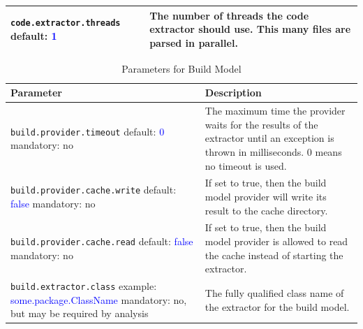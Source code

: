 \begin{table}[t]
\begin{tabularx}{\textwidth}{|p{}|p{}|}
        \texttt{code.extractor.threads} \newline default: \textcolor{blue}{1} & The number of threads the code extractor should use. This many files are parsed in parallel. \\ \hline
        
    \end{tabularx}
\end{table}

\begin{table}[t] %
    \caption{Parameters for Build Model} \label{tab:propfile}
    \begin{tabularx}{\textwidth}{|p{}|p{}|}\hline
        \textbf{Parameter} & \textbf{Description} \\ \hline \hline

        \texttt{build.provider.timeout}  \newline default: \textcolor{blue}{0} \newline mandatory: no  & The maximum time the provider waits for the results of the extractor until an exception is thrown in milliseconds. 0 means no timeout is used. \\ \hline

        \texttt{build.provider.cache.write} \newline default: \textcolor{blue}{false} \newline mandatory: no & If set to true, then the build model provider will write its result to the cache directory.\\ \hline
         
        \texttt{build.provider.cache.read} \newline default: \textcolor{blue}{false}  \newline mandatory: no &  If set to true, then the build model provider is allowed to read the cache instead of starting the extractor. \\ \hline
        
        \texttt{build.extractor.class} \newline example: \textcolor{blue}{some.package.ClassName}  \newline mandatory: no, but may be required by analysis & The fully qualified class name of the extractor for the build model. \\ \hline
    \end{tabularx}
\end{table}




